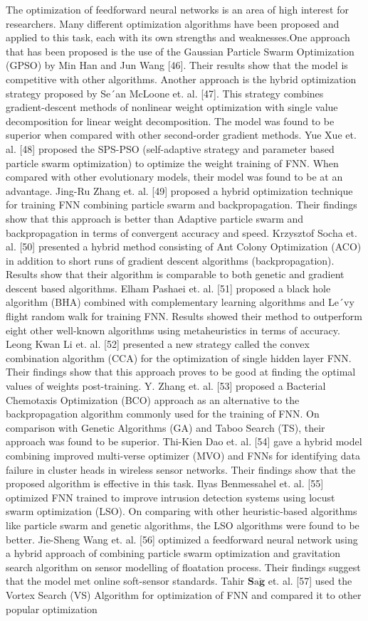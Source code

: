 The optimization of feedforward neural networks is an area of high interest for researchers. Many different optimization algorithms have been proposed and applied to this task, each with its own strengths and weaknesses.One approach that has been proposed is the use of the Gaussian Particle Swarm Optimization (GPSO) by Min Han and Jun Wang [46]. Their results show that the model is competitive with other algorithms. Another approach is the hybrid optimization strategy proposed by Se´an McLoone et. al. [47]. This strategy combines gradient-descent methods of nonlinear weight optimization with single value decomposition for linear weight decomposition. The model was found to be superior when compared with other second-order gradient methods. Yue Xue et. al. [48] proposed the SPS-PSO (self-adaptive strategy and parameter based particle swarm optimization) to optimize the weight training of FNN. When compared with other evolutionary models, their model was found to be at an advantage. Jing-Ru Zhang et. al. [49] proposed a hybrid optimization technique for training FNN combining particle swarm and backpropagation. Their findings show that this approach is better than Adaptive particle swarm and backpropagation in terms of convergent accuracy and speed. Krzysztof Socha et. al. [50] presented a hybrid method consisting of Ant Colony Optimization (ACO) in addition to short runs of gradient descent algorithms (backpropagation). Results show that their algorithm is comparable to both genetic and gradient descent based algorithms. Elham Pashaei et. al. [51] proposed a black hole algorithm (BHA) combined with complementary learning algorithms and Le´vy flight random walk for training FNN. Results showed their method to outperform eight other well-known algorithms using metaheuristics in terms of accuracy. Leong Kwan Li et. al. [52] presented a new strategy called the convex combination algorithm (CCA) for the optimization of single hidden layer FNN. Their findings show that this approach proves to be good at finding the optimal values of weights post-training. Y. Zhang et. al. [53] proposed a Bacterial Chemotaxis Optimization (BCO) approach as an alternative to the backpropagation algorithm commonly used for the training of FNN. On comparison with Genetic Algorithms (GA) and Taboo Search (TS), their approach was found to be superior. Thi-Kien Dao et. al. [54] gave a hybrid model combining improved multi-verse optimizer (MVO) and FNNs for identifying data failure in cluster heads in wireless sensor networks. Their findings show that the proposed algorithm is effective in this task. Ilyas Benmessahel et. al. [55] optimized FNN trained to improve intrusion detection systems using locust swarm optimization (LSO). On comparing with other heuristic-based algorithms like particle swarm and genetic algorithms, the LSO algorithms were found to be better. Jie-Sheng Wang et. al. [56] optimized a feedforward neural network using a hybrid approach of combining particle swarm optimization and gravitation search algorithm on sensor modelling of floatation process. Their findings suggest that the model met online soft-sensor standards. Tahir $\mathbf{S}\mathrm{a}\breve{\mathbf{g}}$ et. al. [57] used the Vortex Search (VS) Algorithm for optimization of FNN and compared it to other popular optimization 